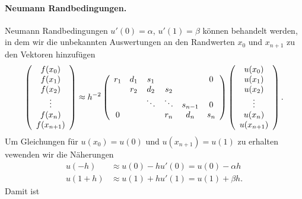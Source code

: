 \documentclass[
]{mycourse}
\theoremstyle{mythm}
\theoremstyle{break}
\begin{document}
\paragraph{Neumann Randbedingungen.} 
Neumann Randbedingungen $u'(0)=\alpha$, $u'(1)=\beta$ können behandelt werden, in dem 
wir die unbekannten Auswertungen an den Randwerten $x_0$ und $x_{n+1}$ zu den Vektoren hinzufügen
\[
\left( \begin{array}{c} f(x_0)\\ f(x_1)\\ f(x_2)\\ \vdots \\ f(x_{n})\\ f(x_{n+1}) \end{array}\right)
\approx h^{-2} \left( \begin{array}{c c c c c c} r_1 & d_1 & s_1 &  & & 0\\ & r_2 & d_2 & s_2 \\ & & \ddots & \ddots & s_{n-1} & 0\\ 0 &  &  & r_{n} & d_{n} & s_{n}\end{array}\right) 
\left( \begin{array}{c} u(x_0) \\ u(x_1)\\ u(x_2)\\ \vdots \\ u(x_{n}) \\ u(x_{n+1})\end{array}\right).
\]
Um Gleichungen für $u(x_0)=u(0)$ und $u(x_{n+1})=u(1)$ zu erhalten vewenden wir die Näherungen
\begin{align*}
u(-h) & \approx u(0)-hu'(0)=u(0)-\alpha h\\
u(1+h) & \approx u(1)+hu'(1)=u(1)+ \beta h.
\end{align*}
Damit ist
\end{document}
